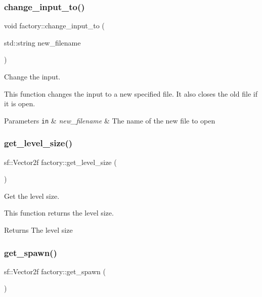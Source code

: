 \subsubsection{\texorpdfstring{change\+\_\+input\+\_\+to()}{change\_input\_to()}}
{\footnotesize\ttfamily void factory\+::change\+\_\+input\+\_\+to (\begin{DoxyParamCaption}\item[{std\+::string}]{new\+\_\+filename }\end{DoxyParamCaption})}



Change the input. 

This function changes the input to a new specified file. It also closes the old file if it is open. 
\begin{DoxyParams}[1]{Parameters}
\mbox{\tt in}  & {\em new\+\_\+filename} & The name of the new file to open \\
\hline
\end{DoxyParams}
\mbox{\label{classfactory_af9bb026273b34fc032ca5ac73d457611}} 
\subsubsection{\texorpdfstring{get\+\_\+level\+\_\+size()}{get\_level\_size()}}
{\footnotesize\ttfamily sf\+::\+Vector2f factory\+::get\+\_\+level\+\_\+size (\begin{DoxyParamCaption}{ }\end{DoxyParamCaption})}



Get the level size. 

This function returns the level size.

\begin{DoxyReturn}{Returns}
The level size 
\end{DoxyReturn}
\mbox{\label{classfactory_a3c3a039b8f76a947267dbe659166550b}} 
\subsubsection{\texorpdfstring{get\+\_\+spawn()}{get\_spawn()}}
{\footnotesize\ttfamily sf\+::\+Vector2f factory\+::get\+\_\+spawn (\begin{DoxyParamCaption}{ }\end{DoxyParamCaption})}



